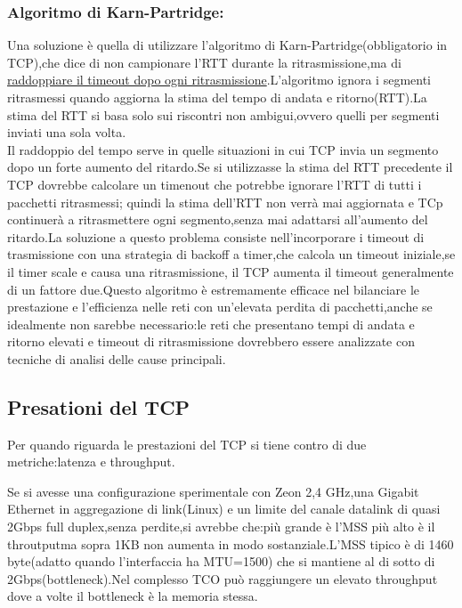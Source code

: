 \subsubsection{Algoritmo di Karn-Partridge:}
Una soluzione è quella di utilizzare l'algoritmo di Karn-Partridge(obbligatorio in TCP),che dice di non campionare l'RTT durante la ritrasmissione,ma di \underline{raddoppiare il timeout dopo ogni ritrasmissione}.L'algoritmo ignora i segmenti ritrasmessi quando aggiorna la stima del tempo di andata e ritorno(RTT).La stima del RTT si basa solo sui riscontri non ambigui,ovvero quelli per segmenti inviati una sola volta. \\
Il raddoppio del tempo serve in quelle situazioni in cui TCP invia un segmento dopo un forte aumento del ritardo.Se si utilizzasse la stima del RTT precedente il TCP dovrebbe calcolare un timenout che potrebbe ignorare l'RTT di tutti i pacchetti ritrasmessi; quindi la stima dell'RTT non verrà mai aggiornata e TCp continuerà a ritrasmettere ogni segmento,senza mai adattarsi all'aumento del ritardo.La soluzione a questo problema consiste nell'incorporare i timeout di trasmissione con una strategia di backoff a timer,che calcola un timeout iniziale,se il timer scale e causa una ritrasmissione, il TCP aumenta il timeout generalmente di un fattore due.Questo algoritmo è estremamente efficace nel bilanciare le prestazione e l'efficienza nelle reti con  un'elevata perdita di pacchetti,anche se idealmente non sarebbe necessario:le reti che presentano tempi di andata e ritorno elevati e timeout di ritrasmissione dovrebbero essere analizzate con tecniche di analisi delle cause principali.
\subsection{Presationi del TCP}
Per quando riguarda le prestazioni del TCP si tiene contro di due metriche:latenza e throughput.
\begin{example}
  Se si avesse una configurazione sperimentale con Zeon 2,4 GHz,una Gigabit Ethernet in aggregazione di link(Linux) e un limite del canale datalink di quasi 2Gbps full duplex,senza perdite,si avrebbe che:più grande è l'MSS più alto è il throutputma sopra 1KB non aumenta in modo sostanziale.L'MSS tipico è di 1460 byte(adatto quando l'interfaccia ha MTU=1500) che si mantiene al di sotto di 2Gbps(bottleneck).Nel complesso TCO può raggiungere un elevato throughput dove a volte il bottleneck è la memoria stessa.
\end{example}

